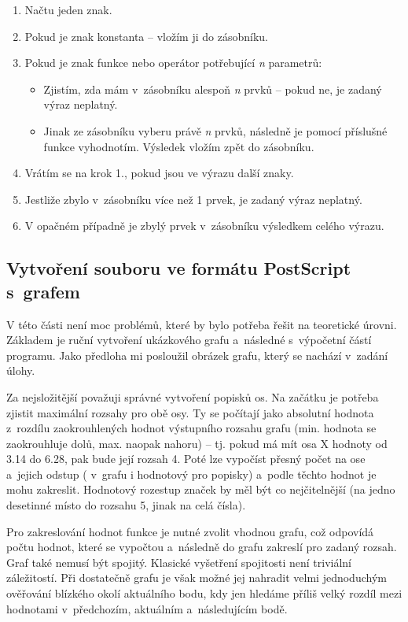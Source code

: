 \documentclass[pdftex,a4paper]{article}
\begin{document}
\begin{enumerate}
\item Načtu jeden znak.
\item Pokud je znak konstanta -- vložím ji do zásobníku.
\item Pokud je znak funkce nebo operátor potřebující \textit{n} parametrů:
\begin{itemize}
\item Zjistím, zda mám v~zásobníku alespoň \textit{n} prvků -- pokud ne, je zadaný výraz neplatný.
\item Jinak ze zásobníku vyberu právě \textit{n} prvků, následně je pomocí příslušné funkce vyhodnotím. Výsledek vložím zpět do zásobníku.
\end{itemize}
\item Vrátím se na krok 1., pokud jsou ve výrazu další znaky.
\item Jestliže zbylo v~zásobníku více než 1 prvek, je zadaný výraz neplatný.
\item V opačném případně je zbylý prvek v~zásobníku výsledkem celého výrazu.
\end{enumerate}


\subsection{Vytvoření souboru ve formátu \textsf{PostScript} s~grafem}\label{subsect:vytv-ps}
V této části není moc problémů, které by bylo potřeba řešit na teoretické úrovni. Základem je ruční vytvoření ukázkového grafu a~následné  s~výpočetní částí programu. Jako předloha mi posloužil obrázek grafu, který se nachází v~zadání úlohy. 

Za nejsložitější považuji správné vytvoření popisků os. Na začátku je potřeba zjistit maximální rozsahy pro obě osy. Ty se počítají jako absolutní hodnota z~rozdílu zaokrouhlených hodnot výstupního rozsahu grafu (min. hodnota se zaokrouhluje dolů, max. naopak nahoru) -- tj. pokud má mít osa X hodnoty od 3.14 do 6.28, pak bude její rozsah 4. Poté lze vypočíst přesný počet  na ose a~jejich odstup ( v~grafu i hodnotový pro popisky) a~podle těchto hodnot je mohu zakreslit. Hodnotový rozestup značek by měl být co nejčitelnější (na jedno desetinné místo do rozsahu 5, jinak na celá čísla).

Pro zakreslování hodnot funkce je nutné zvolit vhodnou  grafu, což odpovídá počtu hodnot, které se vypočtou a~následně do grafu zakreslí pro zadaný rozsah. Graf také nemusí být spojitý. Klasické vyšetření spojitosti není triviální záležitostí. Při dostatečně  grafu je však možné jej nahradit velmi jednoduchým ověřování blízkého okolí aktuálního bodu, kdy jen hledáme příliš velký rozdíl mezi hodnotami v~předchozím, aktuálním a~následujícím bodě.
\end{document}
